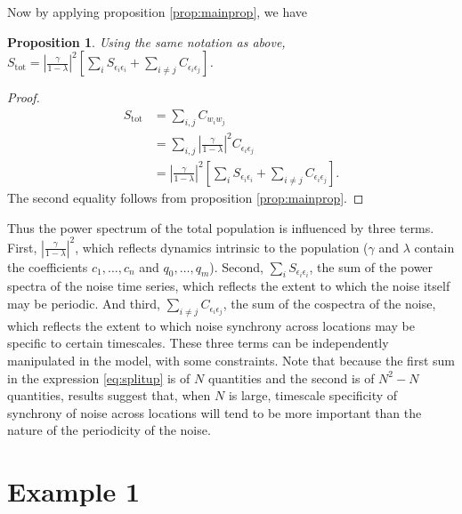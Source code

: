 \documentclass[letterpaper,11pt]{article}
\newtheorem{proposition}[theorem]{Proposition}
\begin{document}
Now by applying proposition \ref{prop:mainprop}, we have
\begin{proposition}
Using the same notation as above,
$S_{\text{tot}} = \left| \frac{\gamma}{1-\lambda} \right|^{ 2} \left[ \sum_i S_{\epsilon_{i}\epsilon_{i}} +\sum_{i \neq j} C_{\epsilon_{i}\epsilon_{j}}\right]$.
\label{prop:mainprop2}
\end{proposition}
\begin{proof}
\begin{align}
S_{\text{tot}} &= \sum_{i,j} C_{w_i w_j} \\
&= \sum_{i,j} \left| \frac{\gamma}{1-\lambda} \right|^{ 2} C_{\epsilon_{i}\epsilon_{j}} \\
&= \left| \frac{\gamma}{1-\lambda} \right|^{ 2} \left[ \sum_i S_{\epsilon_{i}\epsilon_{i}} +\sum_{i \neq j} C_{\epsilon_{i}\epsilon_{j}}\right].\label{eq:splitup}
\end{align}
The second equality follows from proposition \ref{prop:mainprop}.
\end{proof}

Thus the power spectrum of the total  population is influenced by three terms.
First, $\left| \frac{\gamma}{1-\lambda} \right|^{ 2}$, which reflects
dynamics intrinsic to the population ($\gamma$ and $\lambda$ contain
the coefficients $c_1,\ldots,c_n$ and $q_0,\ldots,q_m$). Second,
$\sum_i S_{\epsilon_{i}\epsilon_{i}}$, the  sum of the power
spectra of the noise time series, which reflects the extent to which the noise
itself may be periodic. And third, $\sum_{i \neq j} C_{\epsilon_{i}\epsilon_{j}}$,
the sum of the cospectra of the noise, which reflects the extent to which noise
synchrony across locations may be specific to certain timescales.
These three terms can be independently manipulated in the model, with some
constraints. Note that because the first sum in the expression 
\ref{eq:splitup} is of $N$ quantities and the
second is of $N^2 - N$ quantities, results 
suggest that, when $N$ is large, timescale specificity of
synchrony of noise across locations will tend to be more important than
the nature of the periodicity of the noise.

\section{Example 1}\label{sect:example1}
\end{document}
